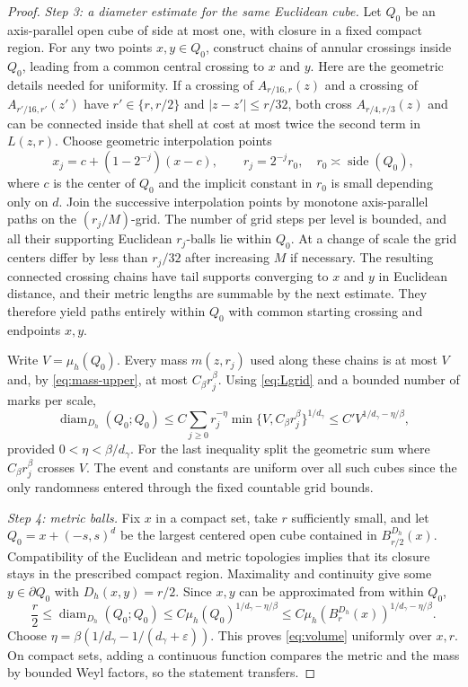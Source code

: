 \documentclass[11pt,reqno]{amsart}
\theoremstyle{plain}
\theoremstyle{definition}
\theoremstyle{remark}
\newcommand{\diam}{\operatorname{diam}}
\newcommand{\1}{\mathbf{1}}
\newcommand{\bh}{B^{D_h}}
\begin{document}
\begin{proof}
\emph{Step 3: a diameter estimate for the same Euclidean cube.} Let $Q_0$ be an axis-parallel open cube of side at most one, with closure in a fixed compact region. For any two points $x,y\in Q_0$, construct chains of annular crossings inside $Q_0$, leading from a common central crossing to $x$ and $y$. Here are the geometric details needed for uniformity. If a crossing of $A_{r/16,r}(z)$ and a crossing of $A_{r'/16,r'}(z')$ have $r'\in\{r,r/2\}$ and $|z-z'|\le r/32$, both cross $A_{r/4,r/3}(z)$ and can be connected inside that shell at cost at most twice the second term in $L(z,r)$. Choose geometric interpolation points
\[
x_j=c+(1-2^{-j})(x-c),\qquad r_j=2^{-j}r_0,\quad r_0\asymp\operatorname{side}(Q_0),
\]
where $c$ is the center of $Q_0$ and the implicit constant in $r_0$ is small depending only on $d$. Join the successive interpolation points by monotone axis-parallel paths on the $(r_j/M)$-grid. The number of grid steps per level is bounded, and all their supporting Euclidean $r_j$-balls lie within $Q_0$. At a change of scale the grid centers differ by less than $r_j/32$ after increasing $M$ if necessary. The resulting connected crossing chains have tail supports converging to $x$ and $y$ in Euclidean distance, and their metric lengths are summable by the next estimate. They therefore yield paths entirely within $Q_0$ with common starting crossing and endpoints $x,y$.

Write $V=\mu_h(Q_0)$. Every mass $m(z,r_j)$ used along these chains is at most $V$ and, by \eqref{eq:mass-upper}, at most $C_\beta r_j^\beta$. Using \eqref{eq:Lgrid} and a bounded number of marks per scale,
\[
\diam_{D_h}(Q_0;Q_0)
\le C\sum_{j\ge0}r_j^{-\eta}\min\{V,C_\beta r_j^\beta\}^{1/d_\gamma}
\le C' V^{1/d_\gamma-\eta/\beta},
\]
provided $0<\eta<\beta/d_\gamma$. For the last inequality split the geometric sum where $C_\beta r_j^\beta$ crosses $V$. The event and constants are uniform over all such cubes since the only randomness entered through the fixed countable grid bounds.

\emph{Step 4: metric balls.} Fix $x$ in a compact set, take $r$ sufficiently small, and let $Q_0=x+(-s,s)^d$ be the largest centered open cube contained in $\bh_{r/2}(x)$. Compatibility of the Euclidean and metric topologies implies that its closure stays in the prescribed compact region. Maximality and continuity give some $y\in\partial Q_0$ with $D_h(x,y)=r/2$. Since $x,y$ can be approximated from within $Q_0$,
\[
\frac r2\le\diam_{D_h}(Q_0;Q_0)
\le C\mu_h(Q_0)^{1/d_\gamma-\eta/\beta}
\le C\mu_h(\bh_r(x))^{1/d_\gamma-\eta/\beta}.
\]
Choose $\eta=\beta(1/d_\gamma-1/(d_\gamma+\varepsilon))$. This proves \eqref{eq:volume} uniformly over $x,r$. On compact sets, adding a continuous function compares the metric and the mass by bounded Weyl factors, so the statement transfers.
\end{proof}
\end{document}
